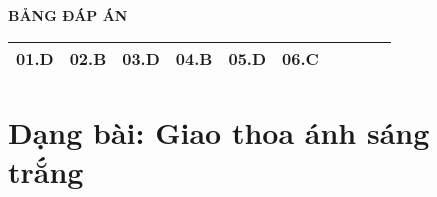 \loigiai
{
	\begin{center}
		\textbf{BẢNG ĐÁP ÁN}
	\end{center}
	\begin{center}
		\begin{tabular}{|m{2.8em}|m{2.8em}|m{2.8em}|m{2.8em}|m{2.8em}|m{2.8em}|m{2.8em}|m{2.8em}|m{2.8em}|m{2.8em}|}
			\hline
			01.D  & 02.B  & 03.D  & 04.B  & 05.D  & 06.C  &  &  &  &  \\
			\hline
			
		\end{tabular}
	\end{center}
}

\section{Dạng bài: Giao thoa ánh sáng trắng}
